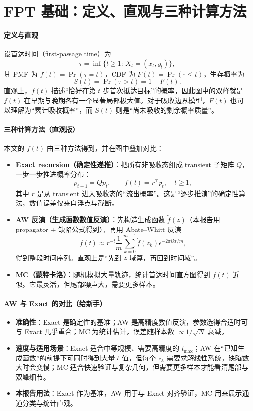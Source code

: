 \documentclass[11pt,fontset=fandol]{ctexart}
\begin{document}
\section{FPT 基础：定义、直观与三种计算方法}
\paragraph{定义与直观}
设首达时间（first-passage time）为
\[
  \tau=\inf\{t\ge 1:\,X_t=(x_t,y_t)\},
\]
其 PMF 为 $f(t)=\Pr(\tau=t)$，CDF 为 $F(t)=\Pr(\tau\le t)$，生存概率为
\[
  S(t)=\Pr(\tau>t)=1-F(t).
\]
直观上，$f(t)$ 描述“恰好在第 $t$ 步首次抵达目标”的概率，因此图中的双峰就是 $f(t)$ 在早期与晚期各有一个显著局部极大值。对于吸收边界模型，$F(t)$ 也可以理解为“累计吸收概率”，而 $S(t)$ 则是“尚未吸收的剩余概率质量”。

\paragraph{三种计算方法（直观版）}
本文的 $f(t)$ 由三种方法得到，并在图中叠加对比：
\begin{itemize}
  \item \textbf{Exact recursion（确定性递推）}：把所有非吸收态组成 transient 子矩阵 $Q$，一步一步推进概率分布：
  \[
    p_{t+1}=Qp_t,\qquad f(t)=r^\top p_t,\quad t\ge 1,
  \]
  其中 $r$ 是从 transient 进入吸收态的“流出概率”。这是“逐步推演”的确定性算法，数值误差仅来自浮点与截断。
  \item \textbf{AW 反演（生成函数数值反演）}：先构造生成函数 $\tilde f(z)$（本报告用 propagator + 缺陷公式得到），再用 Abate--Whitt 反演
  \[
    f(t)\approx r^{-t}\frac{1}{m}\sum_{k=0}^{m-1}\tilde f(z_k)e^{-2\pi i k t/m},
  \]
  得到整段时间序列。直观上是“先到 $z$ 域算，再回到时间域”。
  \item \textbf{MC（蒙特卡洛）}：随机模拟大量轨迹，统计首达时间直方图得到 $f(t)$ 近似。它最灵活，但尾部噪声大，需要更多样本。
\end{itemize}

\paragraph{AW 与 Exact 的对比（给新手）}
\begin{itemize}
  \item \textbf{准确性}：Exact 是确定性的基准；AW 是高精度数值反演，参数选得合适时可与 Exact 几乎重合；MC 为统计估计，误差随样本数 $\propto 1/\sqrt{N}$ 衰减。
  \item \textbf{速度与适用场景}：Exact 适合中等规模、需要高精度的 $t_{\max}$；AW 在“已知生成函数”的前提下可同时得到大量 $t$ 值，但每个 $z_k$ 需要求解线性系统，缺陷数大时会变慢；MC 适合快速验证与复杂几何，但需要更多样本才能看清尾部与双峰细节。
  \item \textbf{本报告用法}：Exact 作为基准，AW 用于与 Exact 对齐验证，MC 用来展示通道分类与统计直观。
\end{itemize}
\end{document}
